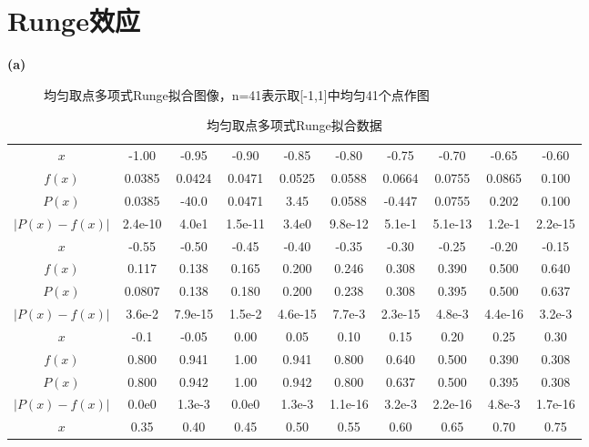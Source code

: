 \documentclass[UTF8]{ctexart}
\begin{document}
\section{Runge效应}

\noindent\textbf{(a)}

\begin{figure}[H]
\centering
\subfigure[$f(x),P(x)$图像]{\texttt{[image: 2-a-1]}}
\subfigure[误差曲线]{\texttt{[image: 2-a-2]}}
\caption{均匀取点多项式Runge拟合图像，n=41表示取[-1,1]中均匀41个点作图}
\end{figure}

\begin{table}[H]
    \caption{均匀取点多项式Runge拟合数据}
    \begin{tabular}{|c|ccccccccc|}
        \hline
        $x$ & -1.00 & -0.95 & -0.90 & -0.85 & -0.80 & -0.75 & -0.70 & -0.65 & -0.60 \\
        $f(x)$ & 0.0385 & 0.0424 & 0.0471 & 0.0525 & 0.0588 & 0.0664 & 0.0755 & 0.0865 & 0.100 \\
        $P(x)$ & 0.0385 & -40.0 & 0.0471 & 3.45 & 0.0588 & -0.447 & 0.0755 & 0.202 & 0.100 \\
        $|P(x)-f(x)|$ & 2.4e-10 & 4.0e1 & 1.5e-11 & 3.4e0 & 9.8e-12 & 5.1e-1 & 5.1e-13 & 1.2e-1 & 2.2e-15 \\
        \hline
        $x$ & -0.55 & -0.50 & -0.45 & -0.40 & -0.35 & -0.30 & -0.25 & -0.20 & -0.15 \\
        $f(x)$ & 0.117 & 0.138 & 0.165 & 0.200 & 0.246 & 0.308 & 0.390 & 0.500 & 0.640 \\
        $P(x)$ & 0.0807 & 0.138 & 0.180 & 0.200 & 0.238 & 0.308 & 0.395 & 0.500 & 0.637 \\
        $|P(x)-f(x)|$ & 3.6e-2 & 7.9e-15 & 1.5e-2 & 4.6e-15 & 7.7e-3 & 2.3e-15 & 4.8e-3 & 4.4e-16 & 3.2e-3 \\
        \hline
        $x$ & -0.1 & -0.05 &  0.00 & 0.05 & 0.10 & 0.15 & 0.20 & 0.25 & 0.30 \\
        $f(x)$ & 0.800 & 0.941 & 1.00 & 0.941 & 0.800 & 0.640 & 0.500 & 0.390 & 0.308 \\
        $P(x)$ & 0.800 & 0.942 & 1.00 & 0.942 & 0.800 & 0.637 & 0.500 & 0.395 & 0.308 \\
        $|P(x)-f(x)|$ & 0.0e0 & 1.3e-3 & 0.0e0 & 1.3e-3 & 1.1e-16 & 3.2e-3 & 2.2e-16 & 4.8e-3 & 1.7e-16 \\
        \hline
        $x$ & 0.35 & 0.40 & 0.45 & 0.50 & 0.55 & 0.60 & 0.65 & 0.70 & 0.75 \\

\end{tabular}
\end{table}
\end{document}
